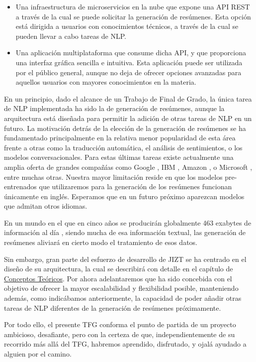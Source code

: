 \vspace*{-0.3cm}

\begin{itemize}
	\item[\textbullet] Una infraestructura de microservicios en la nube que expone una API REST a través de la cual se puede solicitar la generación de resúmenes. Esta opción está dirigida a usuarios con conocimientos técnicos, a través de la cual se pueden llevar a cabo tareas de NLP.
	\item[\textbullet] Una aplicación multiplataforma que consume dicha API, y que proporciona una interfaz gráfica sencilla e intuitiva. Esta aplicación puede ser utilizada por el público general, aunque no deja de ofrecer opciones avanzadas para aquellos usuarios con mayores conocimientos en la materia.
\end{itemize}

\vspace{-0.3cm}

En un principio, dado el alcance de un Trabajo de Final de Grado, la única tarea de NLP implementada ha sido la de generación de resúmenes, aunque la arquitectura está diseñada para permitir la adición de otras tareas de NLP en un futuro. La motivación detrás de la elección de la generación de resúmenes se ha fundamentado principalmente en la relativa menor popularidad de esta área frente a otras como la traducción automática, el análisis de sentimientos, o los modelos conversacionales. Para estas últimas tareas existe actualmente una amplia oferta de grandes compañías como Google \cite{cloudNL}, IBM \cite{watson}, Amazon \cite{comprehend}, o Microsoft \cite{textAnalytics}, entre muchas otras. Nuestra mayor limitación reside en que los modelos pre-entrenados que utilizaremos para la generación de los resúmenes funcionan únicamente en inglés. Esperamos que en un futuro próximo aparezcan modelos que admitan otros idiomas.

En un mundo en el que en cinco años se producirán globalmente 463 exabytes de información al día \cite{raconteur19}, siendo mucha de esa información textual, las generación de resúmenes aliviará en cierto modo el tratamiento de esos datos.

Sin embargo, gran parte del esfuerzo de desarrollo de JIZT se ha centrado en el diseño de su arquitectura, la cual se describirá con detalle en el capítulo de \hyperref[chapter:conceptos]{Conceptos Teóricos}. Por ahora adelantaremos que ha sido concebida con el objetivo de ofrecer la mayor escalabilidad y flexibilidad posible, manteniendo además, como indicábamos anteriormente, la capacidad de poder añadir otras tareas de NLP diferentes de la generación de resúmenes próximamente.

Por todo ello, el presente TFG conforma el punto de partida de un proyecto ambicioso, desafiante, pero con la certeza de que, independientemente de su recorrido más allá del TFG, habremos aprendido, disfrutado, y ojalá ayudado a alguien por el camino.
